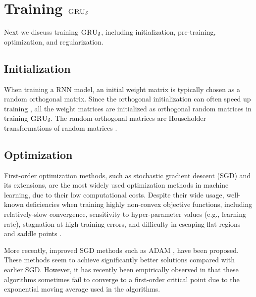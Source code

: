 \documentclass[letterpaper,12pt,titlepage,oneside,final]{book}
\numberwithin{equation}{section}
\theoremstyle{definition}
\newcommand{\model}{\textsc{GRU}_\delta}
\begin{document}
\section{Training $\model$} \label{sec:train}
Next we discuss training  $\model$,  including initialization,  pre-training,  optimization, and regularization.
\subsection{Initialization}\label{sec:init}
When training a RNN model,  an initial weight matrix is typically chosen as a random orthogonal matrix. Since the orthogonal initialization  can often speed up training \citep{le2015simple}, all the weight matrices   are initialized as orthogonal random matrices in training $\model$. The random orthogonal matrices are   Householder transformations of random matrices \citep{le2015simple}.

\subsection{Optimization}
First-order optimization methods, such as stochastic gradient descent (SGD) and its extensions,  are the most widely used optimization methods in machine learning, due to  their low computational costs. Despite their wide usage,  well-known deficiencies when  training highly non-convex objective functions, including  relatively-slow convergence, sensitivity to hyper-parameter values (e.g., learning rate), stagnation at high training errors, and difficulty in escaping flat regions and saddle points \citep{yao2018inexact}.

More recently,  improved SGD methods such as ADAM \citep{kingma2014adam}, have been proposed.
These methods seem to achieve significantly better solutions compared with earlier SGD. However,  it has recently been empirically observed in \cite{reddi2019convergence}  that these algorithms sometimes fail to converge to a first-order critical point due to the exponential moving average used in the algorithms.
\end{document}
